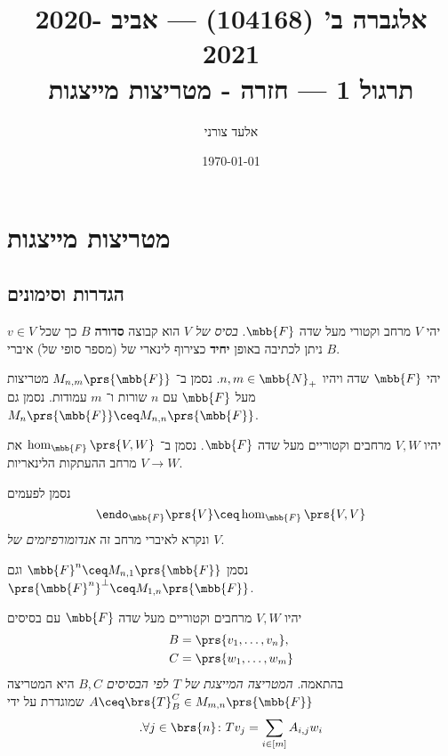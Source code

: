 \documentclass[a4paper,10pt,oneside,openany]{article}
\title{
אלגברה ב' (104168) \textenglish{---} אביב 2020-2021
\\
תרגול 1 \textenglish{---} חזרה - מטריצות מייצגות
}
\author{אלעד צורני}
\date{\today}
\begin{document}
\maketitle

\setcounter{section}{1}

\section*{מטריצות מייצגות}

\subsection*{הגדרות וסימונים}

\begin{definition}
יהי
$V$
מרחב וקטורי מעל שדה
$\mbb{F}$.
\emph{בסיס של
$V$}
הוא קבוצה
\textbf{סדורה}
$B$
כך שכל
$v \in V$
ניתן לכתיבה באופן
\textbf{יחיד}
כצירוף לינארי של (מספר סופי של) איברי
$B$.
\end{definition}

\begin{notation}
יהי
$\mbb{F}$
שדה ויהיו
$n,m \in \mbb{N}_+$.
נסמן ב־%
$M_{n,m}\prs{\mbb{F}}$
מטריצות מעל
$\mbb{F}$
עם
$n$
שורות ו־%
$m$
עמודות.
נסמן גם
$M_n\prs{\mbb{F}} \ceq M_{n,n}\prs{\mbb{F}}$.
\end{notation}

\begin{notation}
יהיו
$V,W$
מרחבים וקטוריים מעל שדה
$\mbb{F}$.
נסמן ב־%
$\hom_{\mbb{F}}\prs{V,W}$
את מרחב ההעתקות הלינאריות
$V \to W$.

נסמן לפעמים
\[\endo_{\mbb{F}}\prs{V} \ceq \hom_{\mbb{F}}\prs{V,V}\]
ונקרא לאיברי מרחב זה
\emph{אנדומורפיזמים של
$V$}.
\end{notation}

\begin{notation}
נסמן
$\mbb{F}^n \ceq M_{n,1}\prs{\mbb{F}}$
וגם
$\prs{\mbb{F}^n}^\perp \ceq M_{1,n}\prs{\mbb{F}}$.
\end{notation}

\begin{definition}
יהיו
$V,W$
מרחבים וקטוריים מעל שדה
$\mbb{F}$
עם בסיסים
\begin{align*}
B &= \prs{v_1, \ldots, v_n}, \\
C &= \prs{w_1, \ldots, w_m}
\end{align*}
בהתאמה.
\emph{המטריצה המייצגת של
$T$
לפי הבסיסים
$B,C$}
היא המטריצה
$A \ceq \brs{T}_B^C \in M_{m,n}\prs{\mbb{F}}$
שמוגדרת על ידי
\begin{align*}
\text{.} \forall j \in \brs{n} \colon T v_j = \sum_{i \in [m]} A_{i,j} w_i
\end{align*}
\end{definition}
\end{document}
